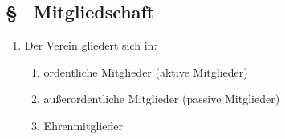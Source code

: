 \subsection{§ \thesaparagraphcounter\ Mitgliedschaft} \label{sa:par:mitgliedschaft}
\begin{enumerate}
    \item \label{sa:abs:p6bgwl} Der Verein gliedert sich in:
    \begin{enumerate}
        \item ordentliche Mitglieder (aktive Mitglieder)
        \item außerordentliche Mitglieder (passive Mitglieder)
        \item Ehrenmitglieder
    \end{enumerate}
\end{enumerate}

